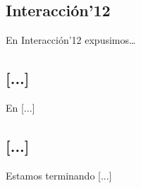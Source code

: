 \subsection{Interacción'12}
En Interacción'12 expusimos\ldots



\subsection{[...]}
En [...]




\subsection{[...]}
Estamos terminando [...]